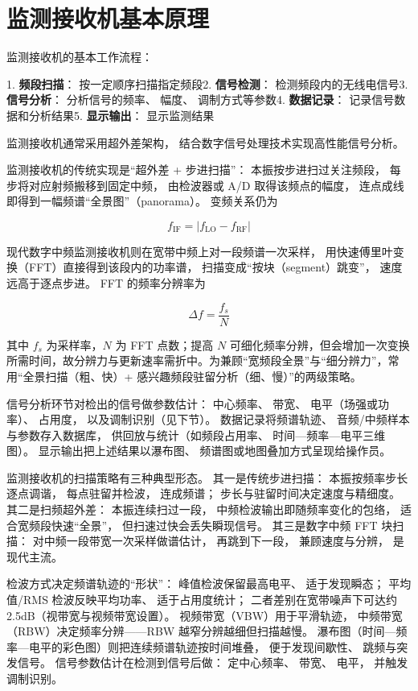 \section{监测接收机基本原理}
\label{sec:monitoring_principle}

监测接收机的基本工作流程：

1. 
\textbf{频段扫描}：
按一定顺序扫描指定频段2. 
\textbf{信号检测}：
检测频段内的无线电信号3. 
\textbf{信号分析}：
分析信号的频率、
幅度、
调制方式等参数4. 
\textbf{数据记录}：
记录信号数据和分析结果5. 
\textbf{显示输出}：
显示监测结果

监测接收机通常采用超外差架构，
结合数字信号处理技术实现高性能信号分析。

监测接收机的传统实现是“超外差 + 步进扫描”：
本振按步进扫过关注频段，
每步将对应射频搬移到固定中频，
由检波器或 A/D 取得该频点的幅度，
连点成线即得到一幅频谱“全景图”（panorama）。
变频关系仍为

\[
f_{\mathrm{IF}}=\left| f_{\mathrm{LO}}-f_{\mathrm{RF}} 
\right|
\]

现代数字中频监测接收机则在宽带中频上对一段频谱一次采样，
用快速傅里叶变换（FFT）直接得到该段内的功率谱，
扫描变成“按块（segment）跳变”，
速度远高于逐点步进。
FFT 的频率分辨率为

\[
\Delta f=\frac{f_s}{N}
\]

其中 $f_s$ 为采样率，$N$ 为 FFT 点数；提高 $N$ 可细化频率分辨，但会增加一次变换所需时间，故分辨力与更新速率需折中。为兼顾“宽频段全景”与“细分辨力”，常用“全景扫描（粗、快）+ 感兴趣频段驻留分析（细、慢）”的两级策略。

信号分析环节对检出的信号做参数估计：
中心频率、
带宽、
电平（场强或功率）、
占用度，
以及调制识别（见下节）。
数据记录将频谱轨迹、
音频/中频样本与参数存入数据库，
供回放与统计（如频段占用率、
时间—频率—电平三维图）。
显示输出把上述结果以瀑布图、
频谱图或地图叠加方式呈现给操作员。

监测接收机的扫描策略有三种典型形态。
其一是传统步进扫描：
本振按频率步长逐点调谐，
每点驻留并检波，
连成频谱；
步长与驻留时间决定速度与精细度。
其二是扫频超外差：
本振连续扫过一段，
中频检波输出即随频率变化的包络，
适合宽频段快速“全景”，
但扫速过快会丢失瞬现信号。
其三是数字中频 FFT 块扫描：
对中频一段带宽一次采样做谱估计，
再跳到下一段，
兼顾速度与分辨，
是现代主流。

检波方式决定频谱轨迹的“形状”：
峰值检波保留最高电平、
适于发现瞬态；
平均值/RMS 检波反映平均功率、
适于占用度统计；
二者差别在宽带噪声下可达约 2.5dB（视带宽与视频带宽设置）。
视频带宽（VBW）用于平滑轨迹，
中频带宽（RBW）决定频率分辨——RBW 越窄分辨越细但扫描越慢。
瀑布图（时间—频率—电平的彩色图）则把连续频谱轨迹按时间堆叠，
便于发现间歇性、
跳频与突发信号。
信号参数估计在检测到信号后做：
定中心频率、
带宽、
电平，
并触发调制识别。


